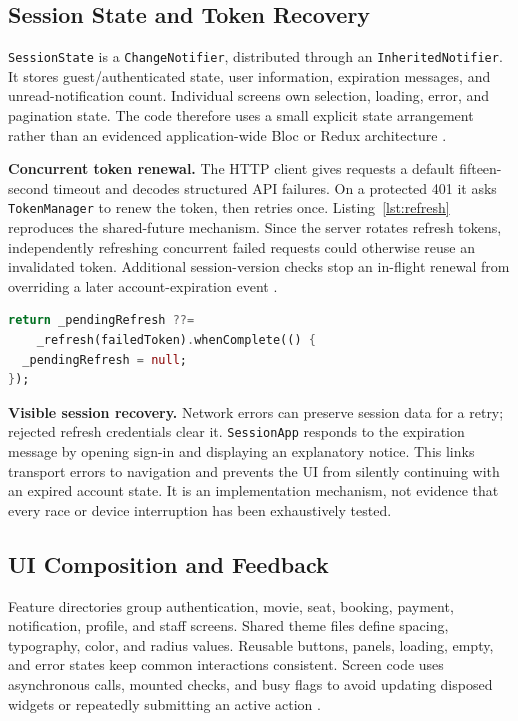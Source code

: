 \documentclass[conference]{IEEEtran}
\newcommand{\code}[1]{\texttt{#1}}
\begin{document}
\subsection{Session State and Token Recovery}
\code{SessionState} is a \code{ChangeNotifier}, distributed through an
\code{InheritedNotifier}. It stores guest/authenticated state, user information,
expiration messages, and unread-notification count. Individual screens own
selection, loading, error, and pagination state. The code therefore uses a
small explicit state arrangement rather than an evidenced application-wide
Bloc or Redux architecture \cite{client}.

\textbf{Concurrent token renewal.} The HTTP client gives requests a default fifteen-second timeout and decodes
structured API failures. On a protected 401 it asks \code{TokenManager} to
renew the token, then retries once. Listing~\ref{lst:refresh} reproduces the
shared-future mechanism. Since the server rotates refresh tokens, independently
refreshing concurrent failed requests could otherwise reuse an invalidated
token. Additional session-version checks stop an in-flight renewal from
overriding a later account-expiration event \cite{client}.
\begin{lstlisting}[language=Dart,caption={Concurrent refresh coordination from TokenManager.},label={lst:refresh}]
return _pendingRefresh ??=
    _refresh(failedToken).whenComplete(() {
  _pendingRefresh = null;
});
\end{lstlisting}

\textbf{Visible session recovery.} Network errors can preserve session data for a retry; rejected refresh
credentials clear it. \code{SessionApp} responds to the expiration message by
opening sign-in and displaying an explanatory notice. This links transport
errors to navigation and prevents the UI from silently continuing with an
expired account state. It is an implementation mechanism, not evidence that
every race or device interruption has been exhaustively tested.

\subsection{UI Composition and Feedback}
Feature directories group authentication, movie, seat, booking, payment,
notification, profile, and staff screens. Shared theme files define spacing,
typography, color, and radius values. Reusable buttons, panels, loading,
empty, and error states keep common interactions consistent. Screen code uses
asynchronous calls, mounted checks, and busy flags to avoid updating disposed
widgets or repeatedly submitting an active action \cite{client,webui}.
\end{document}
